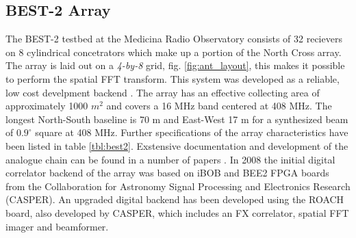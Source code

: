 \documentclass[useAMS,usenatbib,onecolumn]{mn2e}
\begin{document}
\subsection{BEST-2 Array}

The BEST-2 testbed at the Medicina Radio Observatory consists of 32 recievers on 8 cylindrical concetrators which make up a portion of the North Cross array.
The array is laid out on a \emph{4-by-8} grid, fig. \ref{fig:ant_layout}, this makes it possible to perform the spatial FFT transform.
This system was developed as a reliable, low cost develpment backend \citep{best2}.
The array has an effective collecting area of approximately 1000 $m^2$ and covers a 16 MHz band centered at 408 MHz.
The longest North-South baseline is 70 m and East-West 17 m for a synthesized beam of $0.9^{\circ}$ square at 408 MHz.
Further specifications of the array characteristics have been listed in table \ref{tbl:best2}.
Exstensive documentation and development of the analogue chain can be found in a number of papers \citep{best2-lna} \citep{best2-rec}.
In 2008 the initial digital correlator backend of the array was based on iBOB and BEE2 FPGA boards from the Collaboration for Astronomy Signal Processing and Electronics Research (CASPER)\citep{best2-casper}.
An upgraded digital backend has been developed using the ROACH board, also developed by CASPER, which includes an FX correlator, spatial FFT imager and beamformer.
\end{document}
